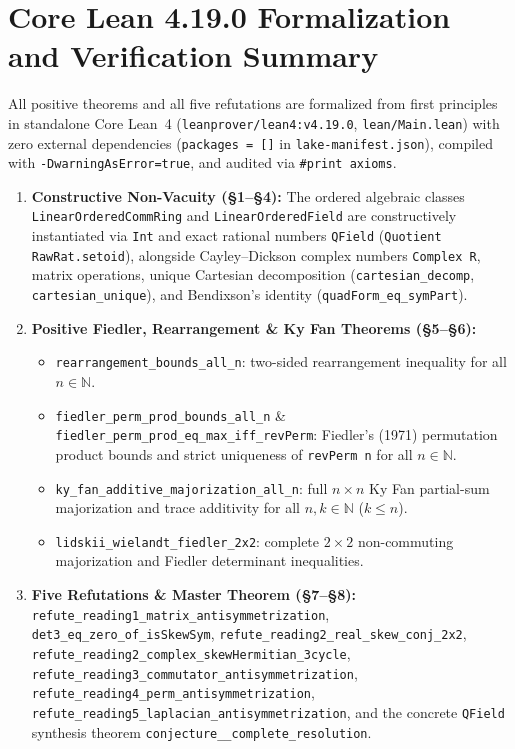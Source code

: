\documentclass[11pt,a4paper]{article}
\newcommand{\ust}{\_\allowbreak}
\theoremstyle{plain}
\theoremstyle{definition}
\newcommand{\N}{\mathbb{N}}
\begin{document}
\section{Core Lean 4.19.0 Formalization and Verification Summary}

All positive theorems and all five refutations are formalized from first principles in standalone Core Lean~4 (\texttt{leanprover/lean4:v4.19.0}, \texttt{lean/Main.lean}) with zero external dependencies (\texttt{packages = []} in \texttt{lake-manifest.json}), compiled with \texttt{-DwarningAsError=true}, and audited via \texttt{\#print axioms}.

\begin{enumerate}
  \item \textbf{Constructive Non-Vacuity (\S1--\S4):} The ordered algebraic classes \texttt{Linear\allowbreak Ordered\allowbreak Comm\allowbreak Ring} and \texttt{Linear\allowbreak Ordered\allowbreak Field} are constructively instantiated via \texttt{Int} and exact rational numbers \texttt{QField} (\texttt{Quotient RawRat.setoid}), alongside Cayley--Dickson complex numbers \texttt{Complex R}, matrix operations, unique Cartesian decomposition (\texttt{cartesian\ust decomp}, \texttt{cartesian\ust unique}), and Bendixson's identity (\texttt{quadForm\ust eq\ust symPart}).
  \item \textbf{Positive Fiedler, Rearrangement \& Ky Fan Theorems (\S5--\S6):}
  \begin{itemize}
    \item \texttt{rearrangement\ust bounds\ust all\ust n}: two-sided rearrangement inequality for all $n \in \N$.
    \item \texttt{fiedler\ust perm\ust prod\ust bounds\ust all\ust n} \& \texttt{fiedler\ust perm\ust prod\ust eq\ust max\ust iff\ust revPerm}: Fiedler's (1971) permutation product bounds and strict uniqueness of \texttt{revPerm n} for all $n \in \N$.
    \item \texttt{ky\ust fan\ust additive\ust majorization\ust all\ust n}: full $n \times n$ Ky Fan partial-sum majorization and trace additivity for all $n, k \in \N$ ($k \le n$).
    \item \texttt{lidskii\ust wielandt\ust fiedler\ust 2x2}: complete $2 \times 2$ non-commuting majorization and Fiedler determinant inequalities.
  \end{itemize}
  \item \textbf{Five Refutations \& Master Theorem (\S7--\S8):}
  \texttt{refute\ust reading1\ust matrix\ust antisymmetrization}, \texttt{det3\ust eq\ust zero\ust of\ust isSkewSym}, \texttt{refute\ust reading2\ust real\ust skew\ust conj\ust 2x2}, \texttt{refute\ust reading2\ust complex\ust skewHermitian\ust 3cycle}, \texttt{refute\ust reading3\ust commutator\ust antisymmetrization}, \texttt{refute\ust reading4\ust perm\ust antisymmetrization}, \texttt{refute\ust reading5\ust laplacian\ust antisymmetrization}, and the concrete \texttt{QField} synthesis theorem \texttt{conjecture\ust 00000007169\ust complete\ust resolution}.
\end{enumerate}
\end{document}
